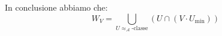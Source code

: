 \documentclass[12pt]{article}
\begin{document}
\medskip

In conclusione abbiamo che: $$W_V = \bigcup_{U\approx_\mathcal{A}\textrm{-classe}} (U \cap (V \cdot U_{\textrm{min}}))$$

%   

%   
\end{document}
